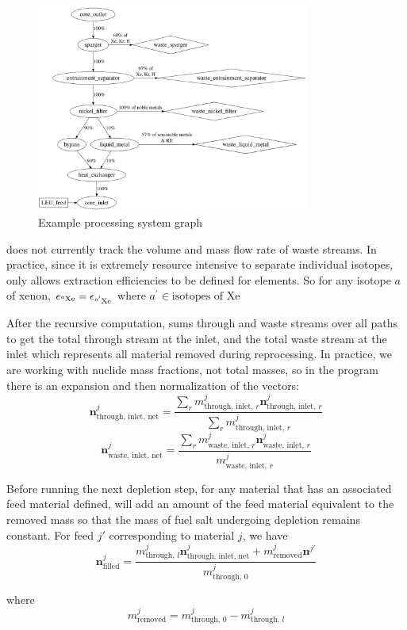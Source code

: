 \begin{figure}[htpb]
    \centering
    \includegraphics[width=0.8\textwidth]{figs/ch3/example_process_graph}
    \caption{Example processing system graph}
    \label{fig:example-graph}
\end{figure}

\SaltProc does not currently track the volume and mass flow rate of waste streams.
In practice, since it is extremely resource intensive to separate individual
isotopes, \SaltProc only allows extraction efficiencies to be defined for
elements. So for any isotope $a$ of xenon,
$\epsilon_{\ce{^{a}Xe}} = \epsilon_{\ce{^{a^{\prime}}Xe}}$  where
$a^{\prime} \in \text{isotopes of Xe}$

After the recursive computation, \SaltProc sums through and waste streams over all
paths to get the total through stream at the inlet, and the total waste stream at
the inlet which represents all material removed during reprocessing. In practice,
we are working with nuclide mass fractions, not total masses, so in the program
there is an expansion and then normalization of the vectors:
\begin{equation}
    \mathbf{n}^{j}_\text{through, inlet, net} = \frac{\sum_{r} m^{j}_{\text{through, inlet, }r} \mathbf{n}^{j}_{\text{through, inlet, }r}}{\sum_{r} m^{j}_{\text{through, inlet, }r}}
\end{equation}
\begin{equation}
    \mathbf{n}^{j}_{\text{waste, inlet, net}} = \frac{\sum_{r} m^{j}_{\text{waste, inlet, }r} \mathbf{n}^{j}_{\text{waste, inlet, }r}}{m^{j}_{\text{waste, inlet, }r}}
\end{equation}

Before running the next depletion step, for any material that has an associated
feed material defined, \SaltProc will add an amount of the feed material
equivalent to the removed mass so that the mass of fuel salt undergoing depletion
remains constant. For feed $j'$ corresponding to material $j$, we have
\begin{equation}
    \mathbf{n}^{j}_\text{filled} = \frac{m^{j}_{\text{through, }l}\mathbf{n}^{j}_\text{through, inlet, net} +  m^{j}_{\text{removed}}\mathbf{n}^{j'}}{m^{j}_{\text{through, }0}}
\end{equation}

where 
\begin{equation}
    m^{j}_\text{removed} = m^{j}_{\text{through, }0} - m^{j}_{\text{through, }l}
\end{equation}
